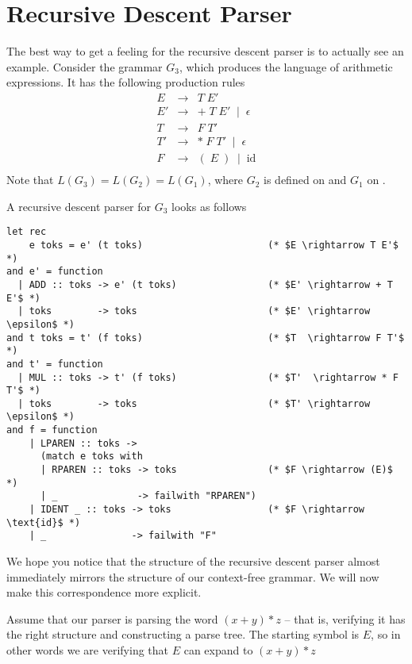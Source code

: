 \section{Recursive Descent Parser}
The best way to get a feeling for the recursive descent parser is to actually see an example. Consider the grammar $G_3$, which produces the language of arithmetic expressions. It has the following production rules
\[
\begin{array}{lcl}
  E  &\to& T \;E' \\
  E' &\to& + \;T\; E' \;\mid\; \epsilon\\
  T  &\to& F\; T'\\
  T' &\to& * \;F\; T' \;\mid\; \epsilon\\
  F  &\to& (\;E\;) \;\mid\; \text{id}\\
\end{array}
\]
Note that $L(G_3) = L(G_2) = L(G_1)$, where $G_2$ is defined on  and $G_1$ on .

A recursive descent parser for $G_3$ looks as follows

\begin{code}
\label{code:ocaml-recursive-descent}
\begin{verbatim}
let rec
    e toks = e' (t toks)                      (* $E \rightarrow T E'$ *)
and e' = function
  | ADD :: toks -> e' (t toks)                (* $E' \rightarrow + T E'$ *)
  | toks        -> toks                       (* $E' \rightarrow \epsilon$ *)
and t toks = t' (f toks)                      (* $T  \rightarrow F T'$ *)
and t' = function
  | MUL :: toks -> t' (f toks)                (* $T'  \rightarrow * F T'$ *)
  | toks        -> toks                       (* $T' \rightarrow \epsilon$ *)
and f = function
    | LPAREN :: toks ->
      (match e toks with
      | RPAREN :: toks -> toks                (* $F \rightarrow (E)$ *) 
      | _              -> failwith "RPAREN")
    | IDENT _ :: toks -> toks                 (* $F \rightarrow \text{id}$ *)
    | _               -> failwith "F"
\end{verbatim}
\end{code}

We hope you notice that the structure of the recursive descent parser almost immediately mirrors the structure of our context-free grammar. We will now make this correspondence more explicit.

Assume that our parser is parsing the word $(x + y) * z$ -- that is, verifying it has the right structure and constructing a parse tree. The starting symbol is $E$, so in other words we are verifying that $E$ can expand to $(x + y) * z$

